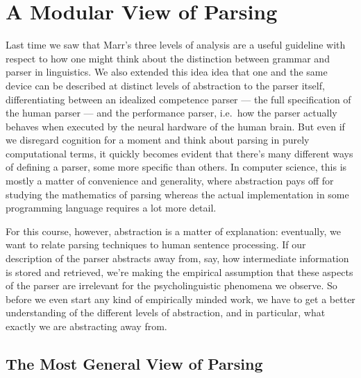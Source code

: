 \chapter{A Modular View of Parsing}
\label{cha:ParserOverview}

Last time we saw that Marr's three levels of analysis are a useful guideline with respect to how one might think about the distinction between grammar and parser in linguistics.
We also extended this idea idea that one and the same device can be described at distinct levels of abstraction to the parser itself, differentiating between an idealized competence parser --- the full specification of the human parser --- and the performance parser, i.e.\ how the parser actually behaves when executed by the neural hardware of the human brain.
But even if we disregard cognition for a moment and think about parsing in purely computational terms, it quickly becomes evident that there's many different ways of defining a parser, some more specific than others.
In computer science, this is mostly a matter of convenience and generality, where abstraction pays off for studying the mathematics of parsing whereas the actual implementation in some programming language requires a lot more detail.

For this course, however, abstraction is a matter of explanation: eventually, we want to relate parsing techniques to human sentence processing.
If our description of the parser abstracts away from, say, how intermediate information is stored and retrieved, we're making the empirical assumption that these aspects of the parser are irrelevant for the psycholinguistic phenomena we observe.
So before we even start any kind of empirically minded work, we have to get a better understanding of the different levels of abstraction, and in particular, what exactly we are abstracting away from.


\section{The Most General View of Parsing}
\label{sec:ParserOverview_MostGeneralView}

